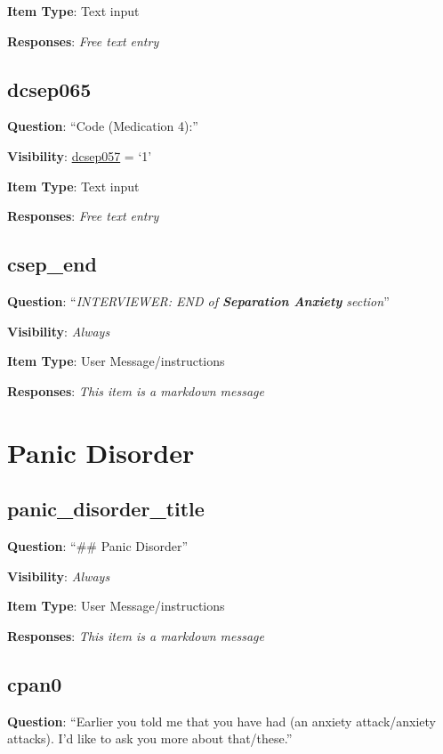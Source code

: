 \documentclass[]{book}
\begin{document}
\textbf{Item Type}: Text input

\textbf{Responses}: \emph{Free text entry}

\hypertarget{dcsep065}{%
\section{dcsep065}\label{dcsep065}}

\textbf{Question}: ``Code (Medication 4):''

\textbf{Visibility}: \protect\hyperlink{dcsep057}{dcsep057} = `1'

\textbf{Item Type}: Text input

\textbf{Responses}: \emph{Free text entry}

\hypertarget{csep_end}{%
\section{csep\_end}\label{csep_end}}

\textbf{Question}: ``\emph{INTERVIEWER: END of \textbf{Separation Anxiety} section}''

\textbf{Visibility}: \emph{Always}

\textbf{Item Type}: User Message/instructions

\textbf{Responses}: \emph{This item is a markdown message}

\hypertarget{panic_section}{%
\chapter{Panic Disorder}\label{panic_section}}

\hypertarget{panic_disorder_title}{%
\section{panic\_disorder\_title}\label{panic_disorder_title}}

\textbf{Question}: ``\#\# Panic Disorder''

\textbf{Visibility}: \emph{Always}

\textbf{Item Type}: User Message/instructions

\textbf{Responses}: \emph{This item is a markdown message}

\hypertarget{cpan0}{%
\section{cpan0}\label{cpan0}}

\textbf{Question}: ``Earlier you told me that you have had (an anxiety attack/anxiety attacks). I'd like to ask you more about that/these.''
\end{document}
